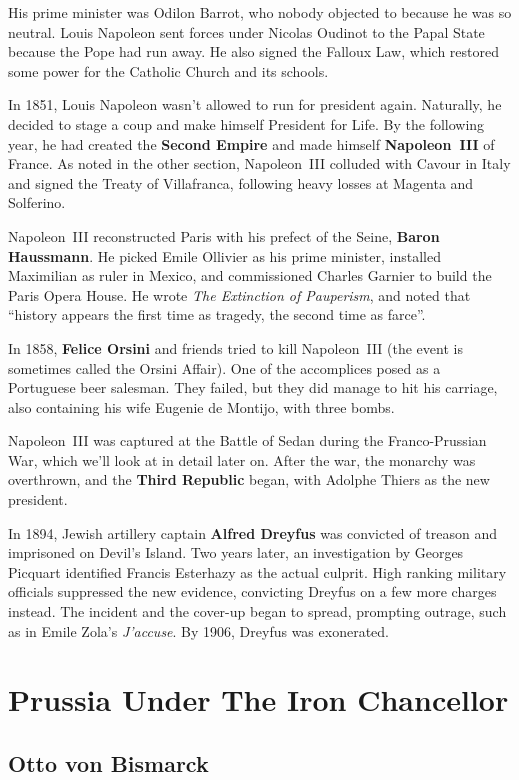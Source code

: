 His prime minister was Odilon Barrot, who nobody objected to because he was so neutral.
Louis Napoleon sent forces under Nicolas Oudinot to the Papal State because the Pope had run away.
He also signed the Falloux Law, which restored some power for the Catholic Church and its schools.

In 1851, Louis Napoleon wasn't allowed to run for president again.
Naturally, he decided to stage a coup and make himself President for Life.
By the following year,
he had created the \textbf{Second Empire} and made himself \textbf{Napoleon~III} of France.
As noted in the other section,
Napoleon~III colluded with Cavour in Italy and signed the Treaty of Villafranca,
following heavy losses at Magenta and Solferino.

Napoleon~III reconstructed Paris with his prefect of the Seine, \textbf{Baron Haussmann}.
He picked Emile Ollivier as his prime minister,
installed Maximilian as ruler in Mexico,
and commissioned Charles Garnier to build the Paris Opera House.
He wrote \textit{The Extinction of Pauperism},
and noted that ``history appears the first time as tragedy, the second time as farce''.

In 1858, \textbf{Felice Orsini} and friends tried to kill Napoleon~III
(the event is sometimes called the Orsini Affair).
One of the accomplices posed as a Portuguese beer salesman.
They failed, but they did manage to hit his carriage,
also containing his wife Eugenie de Montijo, with three bombs.

Napoleon~III was captured at the Battle of Sedan during the Franco-Prussian War,
which we'll look at in detail later on.
After the war, the monarchy was overthrown, and the \textbf{Third Republic} began,
with Adolphe Thiers as the new president.

In 1894, Jewish artillery captain \textbf{Alfred Dreyfus} was convicted of treason
and imprisoned on Devil's Island.
Two years later,
an investigation by Georges Picquart identified Francis Esterhazy as the actual culprit.
High ranking military officials suppressed the new evidence,
convicting Dreyfus on a few more charges instead.
The incident and the cover-up began to spread,
prompting outrage, such as in Emile Zola's \textit{J'accuse}.
By 1906, Dreyfus was exonerated.

\section{Prussia Under The Iron Chancellor}

\subsection*{Otto von Bismarck}

